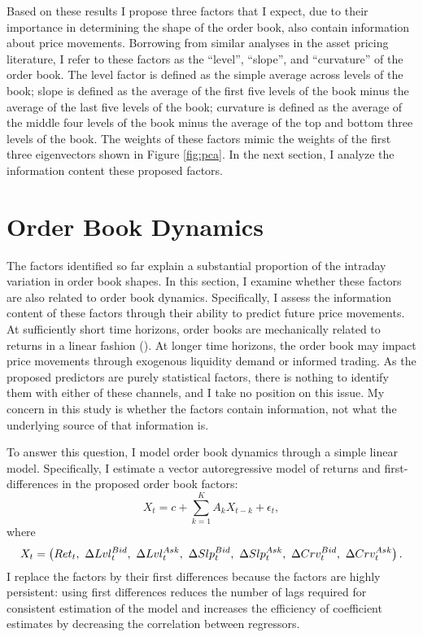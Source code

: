 	Based on these results I propose three factors that I expect, due to their importance in determining the shape of the order book, also contain information about price movements. Borrowing from similar analyses in the asset pricing literature, I refer to these factors as the ``level'', ``slope'', and ``curvature'' of the order book. The level factor is defined as the simple average across levels of the book; slope is defined as the average of the first five levels of the book minus the average of the last five levels of the book; curvature is defined as the average of the middle four levels of the book minus the average of the top and bottom three levels of the book. The weights of these factors mimic the weights of the first three eigenvectors shown in Figure \ref{fig:pca}. In the next section, I analyze the information content these proposed factors.


\section{Order Book Dynamics}
	The factors identified so far explain a substantial proportion of the intraday variation in order book shapes. In this section, I examine whether these factors are also related to order book dynamics. Specifically, I assess the information content of these factors through their ability to predict future price movements. At sufficiently short time horizons, order books are mechanically related to returns in a linear fashion (\citet{Cont2013B}). At longer time horizons, the order book may impact price movements through exogenous liquidity demand or informed trading. As the proposed predictors are purely statistical factors, there is nothing to identify them with either of these channels, and I take no position on this issue. My concern in this study is whether the factors contain information, not what the underlying source of that information is.

	To answer this question, I model order book dynamics through a simple linear model. Specifically, I estimate a vector autoregressive model of returns and first-differences in the proposed order book factors:
	\begin{equation}
	\label{eqn:var}
	X_t = c + \sum_{k=1}^{K} A_k X_{t-k} + \epsilon_t,
	\end{equation}
	where
	\begin{equation}
	X_t = \left( Ret_t, \ \Delta Lvl_t^{Bid}, \ \Delta Lvl_t^{Ask}, \ \Delta Slp_t^{Bid}, \ \Delta Slp_t^{Ask}, \ \Delta Crv_t^{Bid}, \ \Delta Crv_t^{Ask} \right). \notag
	\end{equation}
	I replace the factors by their first differences because the factors are highly persistent: using first differences reduces the number of lags required for consistent estimation of the model and increases the efficiency of coefficient estimates by decreasing the correlation between regressors.

